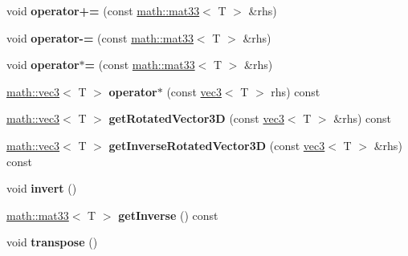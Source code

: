 \begin{DoxyCompactItemize}
\item 
\hypertarget{classmath_1_1mat33_a3cbf3b0094900d864ece681203dc2fa5}{
void {\bfseries operator+=} (const \hyperlink{classmath_1_1mat33}{math::mat33}$<$ T $>$ \&rhs)}
\label{classmath_1_1mat33_a3cbf3b0094900d864ece681203dc2fa5}

\item 
\hypertarget{classmath_1_1mat33_a6b29d96ee8269f39ff96b425940531cd}{
void {\bfseries operator-\/=} (const \hyperlink{classmath_1_1mat33}{math::mat33}$<$ T $>$ \&rhs)}
\label{classmath_1_1mat33_a6b29d96ee8269f39ff96b425940531cd}

\item 
\hypertarget{classmath_1_1mat33_a3aab4bd5fa08664ba84f231684493c36}{
void {\bfseries operator$\ast$=} (const \hyperlink{classmath_1_1mat33}{math::mat33}$<$ T $>$ \&rhs)}
\label{classmath_1_1mat33_a3aab4bd5fa08664ba84f231684493c36}

\item 
\hypertarget{classmath_1_1mat33_a31a1e0240ed69565f6806484bc299de5}{
\hyperlink{classmath_1_1vec3}{math::vec3}$<$ T $>$ {\bfseries operator$\ast$} (const \hyperlink{classmath_1_1vec3}{vec3}$<$ T $>$ rhs) const }
\label{classmath_1_1mat33_a31a1e0240ed69565f6806484bc299de5}

\item 
\hypertarget{classmath_1_1mat33_abb59ea70e98766225e62a8387bb226b2}{
\hyperlink{classmath_1_1vec3}{math::vec3}$<$ T $>$ {\bfseries getRotatedVector3D} (const \hyperlink{classmath_1_1vec3}{vec3}$<$ T $>$ \&rhs) const }
\label{classmath_1_1mat33_abb59ea70e98766225e62a8387bb226b2}

\item 
\hypertarget{classmath_1_1mat33_aeb611d48183298eae28cf4f7bba747df}{
\hyperlink{classmath_1_1vec3}{math::vec3}$<$ T $>$ {\bfseries getInverseRotatedVector3D} (const \hyperlink{classmath_1_1vec3}{vec3}$<$ T $>$ \&rhs) const }
\label{classmath_1_1mat33_aeb611d48183298eae28cf4f7bba747df}

\item 
\hypertarget{classmath_1_1mat33_a4669d8706bdfcd57647c98d6ba52128b}{
void {\bfseries invert} ()}
\label{classmath_1_1mat33_a4669d8706bdfcd57647c98d6ba52128b}

\item 
\hypertarget{classmath_1_1mat33_aec8b7fb7359e71e6b75cb2d0f26f17b3}{
\hyperlink{classmath_1_1mat33}{math::mat33}$<$ T $>$ {\bfseries getInverse} () const }
\label{classmath_1_1mat33_aec8b7fb7359e71e6b75cb2d0f26f17b3}

\item 
\hypertarget{classmath_1_1mat33_aa65877efa975cdfdc28379d819eb2d68}{
void {\bfseries transpose} ()}
\label{classmath_1_1mat33_aa65877efa975cdfdc28379d819eb2d68}


\end{DoxyCompactItemize}
